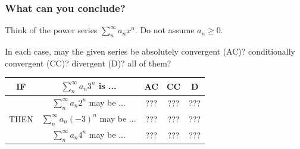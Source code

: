 \begin{frame}[t]
	\fontsize{13}{13}\selectfont
	\frametitle{What can you conclude?}

	Think of the power series $\displaystyle \sum_{n}^{\infty}a_{n}x^{n}$. Do not
	assume $a_{n}\geq0$.

	In each case, may the given series be absolutely convergent (AC)?
	conditionally convergent (CC)? divergent (D)? all of them?

	\begin{center}
		\begin{tabular}{c|c|c|c|c|}
			\hline
			IF               & $\displaystyle \sum_{n}^{\infty}a_{n}3^{n}$ is ...        & AC                                                                              & CC                                                                              & D                                                                               \\
			\hline
			\hline
			                 & $\displaystyle \sum_{n}^{\infty}a_{n}2^{n}$ may be ...    & \phantom{$\displaystyle \frac{1}{1}$} ??? \phantom{$\displaystyle \frac{1}{1}$} & \phantom{$\displaystyle \frac{1}{1}$} ??? \phantom{$\displaystyle \frac{1}{1}$} & \phantom{$\displaystyle \frac{1}{1}$} ??? \phantom{$\displaystyle \frac{1}{1}$} \\
			\cline{2-5} THEN & $\displaystyle \sum_{n}^{\infty}a_{n}(-3)^{n}$ may be ... & \phantom{$\displaystyle \frac{1}{1}$} ??? \phantom{$\displaystyle \frac{1}{1}$} & \phantom{$\displaystyle \frac{1}{1}$} ??? \phantom{$\displaystyle \frac{1}{1}$} & \phantom{$\displaystyle \frac{1}{1}$} ??? \phantom{$\displaystyle \frac{1}{1}$} \\
			\cline{2-5}      & $\displaystyle \sum_{n}^{\infty}a_{n}4^{n}$ may be ...    & \phantom{$\displaystyle \frac{1}{1}$} ??? \phantom{$\displaystyle \frac{1}{1}$} & \phantom{$\displaystyle \frac{1}{1}$} ??? \phantom{$\displaystyle \frac{1}{1}$} & \phantom{$\displaystyle \frac{1}{1}$} ??? \phantom{$\displaystyle \frac{1}{1}$} \\
			\hline
		\end{tabular}
	\end{center}
\end{frame}

